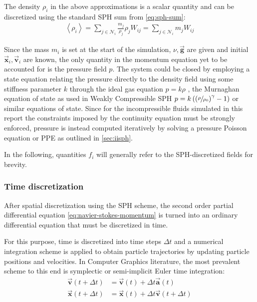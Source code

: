 \documentclass[oneside, a4paper]{book}
\newcommand\angled[1]{\left\langle#1\right\rangle}
\newcommand\vek[1]{\vec{\bm{#1}}}
\newcommand\br[1]{\left(#1\right)}
\begin{document}
    The density $\rho_i$ in the above approximations is a scalar quantity and can be discretized using the standard SPH sum from \autoref{eq:sph-sum}:
    \begin{align}\label{eq:discrete-density}
      \angled{\rho_i}  
      = \sum_{j\in\mathcal{N}_i} \frac{m_j}{\rho_j} \rho_j W_{ij} 
      = \sum_{j\in\mathcal{N}_i} m_j W_{ij} 
    \end{align}

    Since the mass $m_i$ is set at the start of the simulation, $\nu,\vek{g}$ are given and initial $\vek{x}_i, \vek{v}_i$ are known, the only quantity in the momentum equation yet to be accounted for is the pressure field $p$. The system could be closed by employing a state equation relating the pressure directly to the density field using some stiffness parameter $k$ through the ideal gas equation $p=k\rho$ \autocite{müller-2003}, the Murnaghan equation of state \autocite{murnaghan-eos} as used in Weakly Compressible SPH \autocite{wcsph} $p=k\br{\br{\sfrac{\rho}{\rho_0}}^\gamma-1}$ or similar equations of state. Since for the incompressible fluids simulated in this report the constraints imposed by the continuity equation must be strongly enforced, pressure is instead computed iteratively by solving a pressure Poisson equation or PPE as outlined in \autoref{sec:iisph}.

    In the following, quantities $f_i$ will generally refer to the SPH-discretized fields for brevity.

    \subsubsection{Time discretization}
    After spatial discretization using the SPH scheme, the second order partial differential equation \autoref{eq:navier-stokes-momentum} is turned into an ordinary differential equation \autocite{tutorial2019} that must be discretized in time. 

    For this purpose, time is discretized into time steps $\Delta t$ and a numerical integration scheme is applied to obtain particle trajectories by updating particle positions and velocities. In Computer Graphics literature, the most prevalent scheme \autocites{tutorial2019}{wcsph}{iisph}{iisph-flip}{dfsph} to this end is symplectic or semi-implicit Euler time integration:
    \begin{align}
      \vek{v}(t+\Delta t) &= \vek{v}(t) + \Delta t \vek{a}(t)\\
      \vek{x}(t+\Delta t) &= \vek{x}(t) + \Delta t \vek{v}(t+\Delta t)
    \end{align}
\end{document}
